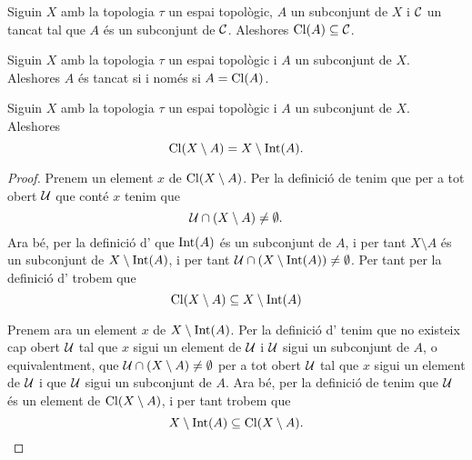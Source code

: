 \documentclass[../Apunts.tex]{subfiles}
\begin{document}
	\begin{corollary}
		\label{cor:la clausura d'un conjunt és el tancat més petit que el conté}
		Siguin \(X\) amb la topologia \(\tau\) un espai topològic, \(A\) un subconjunt de \(X\) i \(\mathcal{C}\) un tancat tal que \(A\) és un subconjunt de \(\mathcal{C}\). Aleshores \(\operatorname{Cl}(A)\subseteq\mathcal{C}\).
	\end{corollary}
	\begin{corollary}
		\label{cor:un conjunt és tancat si i només si és igual a la seva clausura}
		Siguin \(X\) amb la topologia \(\tau\) un espai topològic i \(A\) un subconjunt de \(X\). Aleshores \(A\) és tancat si i només si \(A=\operatorname{Cl}(A)\).
	\end{corollary}
	\begin{proposition}
		\label{prop:la clausura d'un conjunt és el complementari de l'interior del complementari del conjunt}
		Siguin \(X\) amb la topologia \(\tau\) un espai topològic i \(A\) un subconjunt de \(X\). Aleshores
		\[\operatorname{Cl}(X\setminus A)=X\setminus\operatorname{Int}(A).\]
		\begin{proof} %
			Prenem un element \(x\) de \(\operatorname{Cl}(X\setminus A)\). Per la definició de  tenim que per a tot obert \(\mathcal{U}\) que conté \(x\) tenim que
			\[\mathcal{U}\cap(X\setminus A)\neq\emptyset.\]
			Ara bé, per la definició d' que \(\operatorname{Int}(A)\) és un subconjunt de \(A\), i per tant \(X\setminus A\) és un subconjunt de \(X\setminus\operatorname{Int}(A)\), i per tant \(\mathcal{U}\cap(X\setminus\operatorname{Int}(A))\neq\emptyset\). Per tant per la definició d' trobem que
			\begin{equation}
				\label{prop:la clausura d'un conjunt és el complementari de l'interior del complementari del conjunt:eq1}
				\operatorname{Cl}(X\setminus A)\subseteq X\setminus\operatorname{Int}(A)
			\end{equation}
			
			Prenem ara un element \(x\) de \(X\setminus\operatorname{Int}(A)\). Per la definició d' tenim que no existeix cap obert \(\mathcal{U}\) tal que \(x\) sigui un element de \(\mathcal{U}\) i \(\mathcal{U}\) sigui un subconjunt de \(A\), o equivalentment, que \(\mathcal{U}\cap(X\setminus A)\neq\emptyset\) per a tot obert \(\mathcal{U}\) tal que \(x\) sigui un element de  \(\mathcal{U}\) i que \(\mathcal{U}\) sigui un subconjunt de \(A\). Ara bé, per la definició de  tenim que \(\mathcal{U}\) és un element de \(\operatorname{Cl}(X\setminus A)\), i per tant trobem que
			\begin{equation}
				\label{prop:la clausura d'un conjunt és el complementari de l'interior del complementari del conjunt:eq2}
				X\setminus\operatorname{Int}(A)\subseteq\operatorname{Cl}(X\setminus A).
			\end{equation}
			

\end{proof}
\end{proposition}
\end{document}
